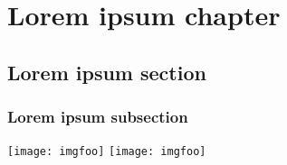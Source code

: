 \documentclass[a4paper,parskip=half,oneside]{scrbook}
\begin{document}
\chapter{Lorem ipsum chapter}
\section{Lorem ipsum section}
\subsection{Lorem ipsum subsection}

\texttt{[image: imgfoo]}
\texttt{[image: imgfoo]}
\end{document}
